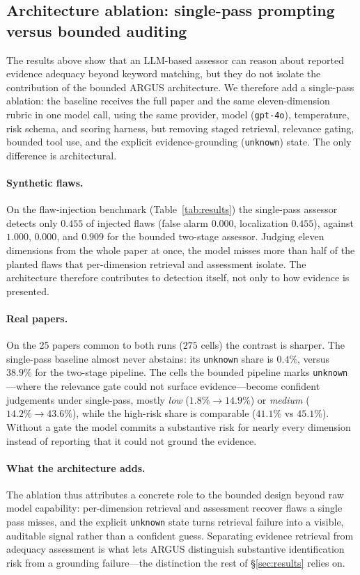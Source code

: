 \subsection{Architecture ablation: single-pass prompting versus bounded auditing}
\label{sec:ablation}
The results above show that an LLM-based assessor can reason about reported
evidence adequacy beyond keyword matching, but they do not isolate the
contribution of the bounded ARGUS architecture. We therefore add a single-pass
ablation: the baseline receives the full paper and the same eleven-dimension
rubric in one model call, using the same provider, model (\texttt{gpt-4o}),
temperature, risk schema, and scoring harness, but removing staged retrieval,
relevance gating, bounded tool use, and the explicit evidence-grounding
(\texttt{unknown}) state. The only difference is architectural.

\paragraph{Synthetic flaws.}
On the flaw-injection benchmark (Table~\ref{tab:results}) the single-pass assessor
detects only $0.455$ of injected flaws (false alarm $0.000$, localization
$0.455$), against $1.000$, $0.000$, and $0.909$ for the bounded two-stage assessor. Judging eleven
dimensions from the whole paper at once, the model misses more than half of the
planted flaws that per-dimension retrieval and assessment isolate. The
architecture therefore contributes to detection itself, not only to how evidence
is presented.

\paragraph{Real papers.}
On the 25 papers common to both runs ($275$ cells) the contrast is sharper. The
single-pass baseline almost never abstains: its \texttt{unknown} share is $0.4\%$,
versus $38.9\%$ for the two-stage pipeline. The cells the bounded pipeline marks
\texttt{unknown}---where the relevance gate could not surface evidence---become
confident judgements under single-pass, mostly \emph{low} ($1.8\%\to14.9\%$) or
\emph{medium} ($14.2\%\to43.6\%$), while the high-risk share is comparable
($41.1\%$ vs $45.1\%$). Without a gate the model commits a substantive risk for
nearly every dimension instead of reporting that it could not ground the evidence.

\paragraph{What the architecture adds.}
The ablation thus attributes a concrete role to the bounded design beyond raw
model capability: per-dimension retrieval and assessment recover flaws a single
pass misses, and the explicit \texttt{unknown} state turns retrieval failure into
a visible, auditable signal rather than a confident guess. Separating evidence
retrieval from adequacy assessment is what lets ARGUS distinguish substantive
identification risk from a grounding failure---the distinction the rest of
\S\ref{sec:results} relies on.

